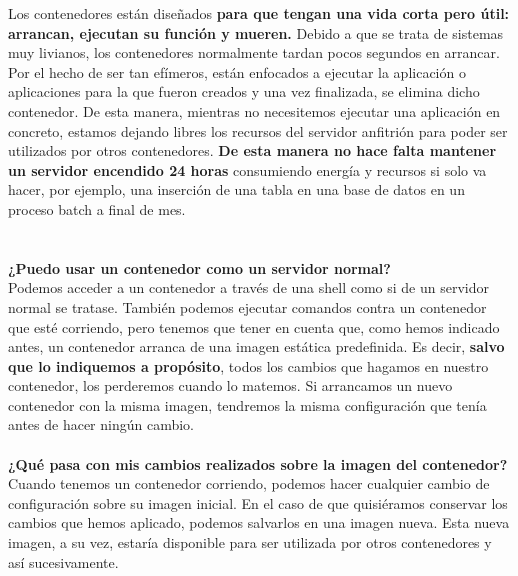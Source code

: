 \documentclass[twoside,twocolumn]{article}
\begin{document}
\begin{flushright}
\begin{itemize}
Los contenedores están diseñados \textbf{para que tengan una vida corta pero útil: arrancan, ejecutan su función y mueren.} Debido a que se trata de sistemas muy livianos, los contenedores normalmente tardan pocos segundos en arrancar. Por el hecho de ser tan efímeros, están enfocados a ejecutar la aplicación o aplicaciones para la que fueron creados y una vez finalizada, se elimina dicho contenedor. De esta manera, mientras no necesitemos ejecutar una aplicación en concreto, estamos dejando libres los recursos del servidor anfitrión para poder ser utilizados por otros contenedores. \textbf{De esta manera no hace falta mantener un servidor encendido 24 horas} consumiendo energía y recursos si solo va hacer, por ejemplo, una inserción de una tabla en una base de datos en un proceso batch a final de mes.
\textbf{}\\
\textbf{}\\
\textbf{}\\
\textbf{¿Puedo usar un contenedor como un servidor normal?}\\
Podemos acceder a un contenedor a través de una shell como si de un servidor normal se tratase. También podemos ejecutar comandos contra un contenedor que esté corriendo, pero tenemos que tener en cuenta que, como hemos indicado antes, un contenedor arranca de una imagen estática predefinida. Es decir, \textbf{salvo que lo indiquemos a propósito}, todos los cambios que hagamos en nuestro contenedor, los perderemos cuando lo matemos. Si arrancamos un nuevo contenedor con la misma imagen, tendremos la misma configuración que tenía antes de hacer ningún cambio.
\textbf{}\\
\textbf{}\\
\textbf{¿Qué pasa con mis cambios realizados sobre la imagen del contenedor?}\\
Cuando tenemos un contenedor corriendo, podemos hacer cualquier cambio de configuración sobre su imagen inicial. En el caso de que quisiéramos conservar los cambios que hemos aplicado, podemos salvarlos en una imagen nueva. Esta nueva imagen, a su vez, estaría disponible para ser utilizada por otros contenedores y así sucesivamente.

\textbf{}\\
\textbf{}\\



\end{itemize}
\end{flushright}
\end{document}
